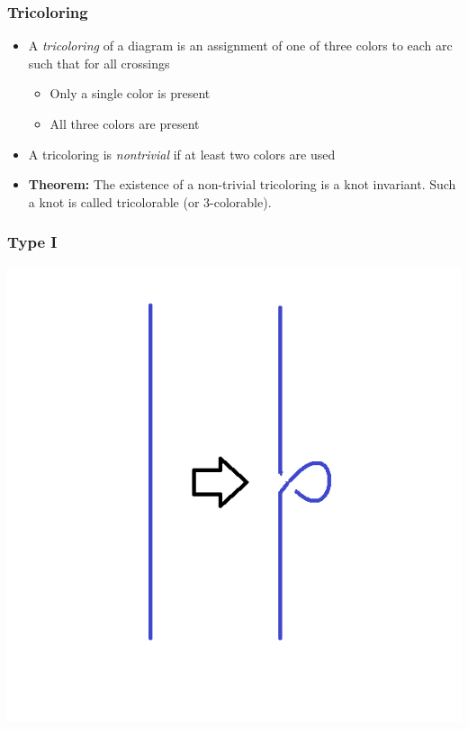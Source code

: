 \documentclass{beamer}
\begin{document}
\begin{frame}
  \frametitle{Tricoloring}
  \begin{itemize}
  \item A \textit{tricoloring} of a diagram is an assignment
    of one of three colors to each arc such that for all crossings
    \begin{itemize}
      \pause
    \item Only a single color is present
      \pause
    \item All three colors are present
    \end{itemize}
    \pause
  \item A tricoloring is \textit{nontrivial} if at least two colors are used
    \pause
  \item \textbf{Theorem:} The existence of a non-trivial tricoloring is a knot
    invariant. Such a knot is called tricolorable (or $3$-colorable).
  \end{itemize}
\end{frame}

\begin{frame}
  \frametitle{Type I}
  \begin{center}
    \includegraphics[scale=.4]{t1-c}
  \end{center}
\end{frame}
\end{document}
